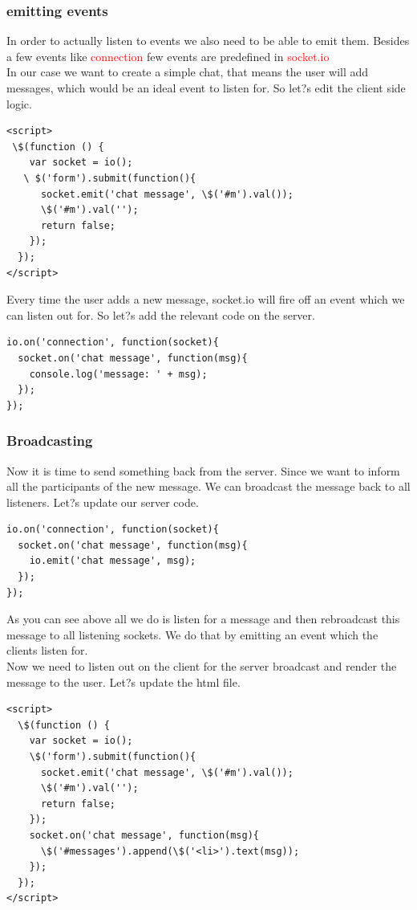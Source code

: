\documentclass[a4paper]{article}
\begin{document}
\subsubsection{emitting events}
In order to actually listen to events we also need to be able to emit them. Besides a few events like \textcolor{red}{connection} few events are predefined in \textcolor{red}{socket.io}\\

In our case we want to create a simple chat, that means the user will add messages, which would be an ideal event to listen for. So let?s edit the client side logic.
\begin{lstlisting}
<script>
 \$(function () {
    var socket = io();
   \ $('form').submit(function(){
      socket.emit('chat message', \$('#m').val());
      \$('#m').val('');
      return false;
    });
  });
</script>
\end{lstlisting}
Every time the user adds a new message, socket.io will fire off an event which we can listen out for. So let?s add the relevant code on the server.
\begin{lstlisting}
io.on('connection', function(socket){
  socket.on('chat message', function(msg){
    console.log('message: ' + msg);
  });
});

\end{lstlisting}
\subsubsection{Broadcasting}
Now it is time to send something back from the server. Since we want to inform all the participants of the new message. We can broadcast the message back to all listeners. Let?s update our server code.
\begin{lstlisting}
io.on('connection', function(socket){
  socket.on('chat message', function(msg){
    io.emit('chat message', msg);
  });
});
\end{lstlisting}
As you can see above all we do is listen for a message and then rebroadcast this message to all listening sockets. We do that by emitting an event which the clients listen for.\\

Now we need to listen out on the client for the server broadcast and render the message to the user. Let?s update the html file.
\begin{lstlisting}
<script>
  \$(function () {
    var socket = io();
    \$('form').submit(function(){
      socket.emit('chat message', \$('#m').val());
      \$('#m').val('');
      return false;
    });
    socket.on('chat message', function(msg){
      \$('#messages').append(\$('<li>').text(msg));
    });
  });
</script>
\end{lstlisting}
\end{document}
